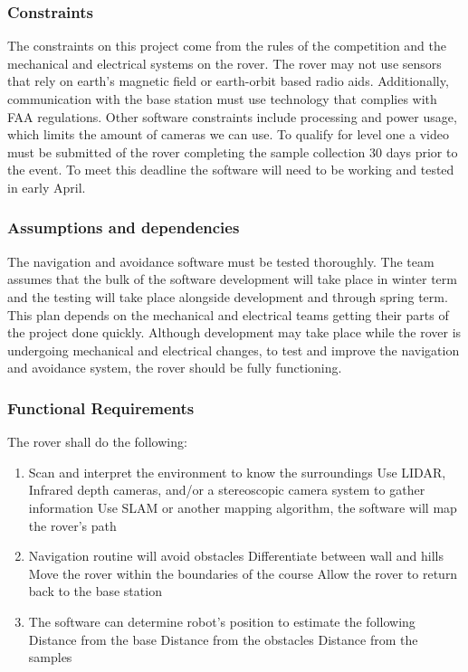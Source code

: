 \documentclass[10pt, oneside,onecolumn]{IEEEtran}
\begin{document}
\begin{titlepage}
\subsubsection{Constraints}
The constraints on this project come from the rules of the competition and the mechanical and electrical systems on the rover. The rover may not use sensors that rely on earth's magnetic field or earth-orbit based radio aids. Additionally, communication with the base station must use technology that complies with FAA regulations. Other software constraints include processing and power usage, which limits the amount of cameras we can use. To qualify for level one a video must be submitted of the rover completing the sample collection 30 days prior to the event. To meet this deadline the software will need to be working and tested in early April. 

\subsubsection{Assumptions and dependencies}
The navigation and avoidance software must be tested thoroughly. The team assumes that the bulk of the software development will take place in winter term and the testing will take place alongside development and through spring term. This plan depends on the mechanical and electrical teams getting their parts of the project done quickly. Although development may take place while the rover is undergoing mechanical and electrical changes, to test and improve the navigation and avoidance system, the rover should be fully functioning. 

\subsubsection{Functional Requirements}
The rover shall do the following:
\begin{enumerate}
\item Scan and interpret the environment to know the surroundings
\subitem Use LIDAR, Infrared depth cameras, and/or a stereoscopic camera system to gather information
\subitem Use SLAM or another mapping algorithm, the software will map the rover's path

\item Navigation routine will avoid obstacles 
\subitem Differentiate between wall and hills
\subitem Move the rover within the boundaries of the course
\subitem Allow the rover to return back to the base station

\item The software can determine robot's position to estimate the following
\subitem Distance from the base
\subitem Distance from the obstacles 
\subitem Distance from the samples
	

\end{enumerate}
\end{titlepage}
\end{document}
